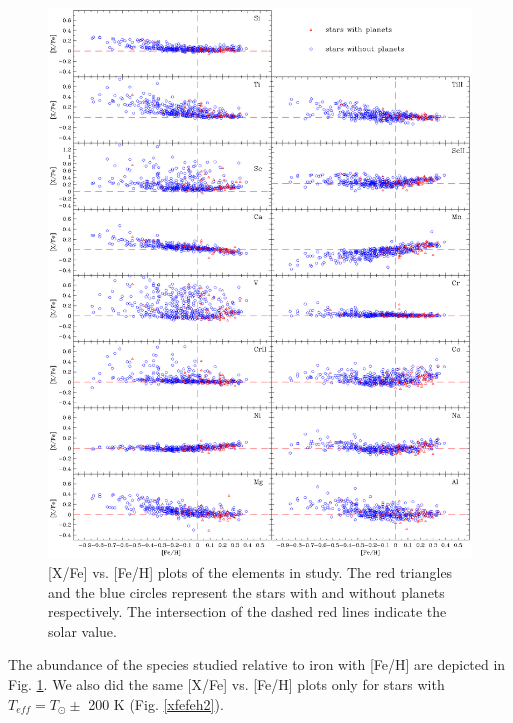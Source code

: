\documentclass[dvips,12pt,a4paper]{report}
\begin{document}
{{\begin{figure}[h!]
\centering
\includegraphics[trim=0cm 2cm 0cm 1cm,clip,width=15 cm]{pics/parte4/xfefehfinal/xfefehfinal.eps}
\caption[abundance gfx]{[X/Fe] vs. [Fe/H] plots of the elements in study. The red triangles and the blue circles represent the stars with and without planets respectively. The intersection of the dashed red lines indicate the solar value.}
\label{xfefeh1}
\end{figure}

The abundance of the species studied relative to iron with [Fe/H] are depicted in Fig. \ref{xfefeh1}. We also did the same [X/Fe] vs. [Fe/H] plots only for stars with $T_{eff}=T_\odot\pm$ 200 K (Fig. \ref{xfefeh2}). 

}}
\end{document}
